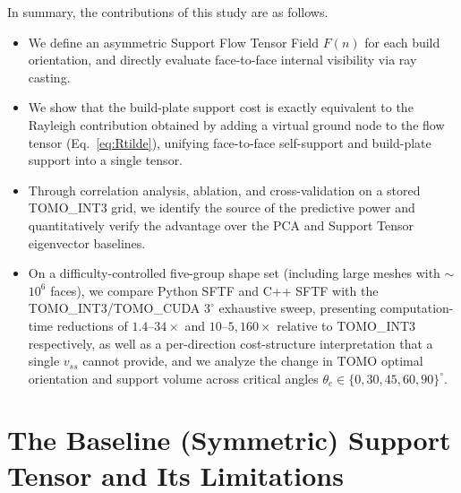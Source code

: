 \documentclass[11pt,a4paper]{article}
\begin{document}
In summary, the contributions of this study are as follows.
\begin{itemize}
\item We define an asymmetric Support Flow Tensor Field $F(n)$ for each build orientation, and directly evaluate face-to-face internal visibility via ray casting.
\item We show that the build-plate support cost is exactly equivalent to the Rayleigh contribution obtained by adding a virtual ground node to the flow tensor (Eq.~\eqref{eq:Rtilde}), unifying face-to-face self-support and build-plate support into a single tensor.
\item Through correlation analysis, ablation, and cross-validation on a stored TOMO\_INT3 grid, we identify the source of the predictive power and quantitatively verify the advantage over the PCA and Support Tensor eigenvector baselines.
\item On a difficulty-controlled five-group shape set (including large meshes with $\sim$$10^6$ faces), we compare Python SFTF and C++ SFTF with the TOMO\_INT3/TOMO\_CUDA $3^\circ$ exhaustive sweep, presenting computation-time reductions of $1.4$--$34\times$ and $10$--$5{,}160\times$ relative to TOMO\_INT3 respectively, as well as a per-direction cost-structure interpretation that a single $v_{ss}$ cannot provide, and we analyze the change in TOMO optimal orientation and support volume across critical angles $\theta_c\in\{0,30,45,60,90\}^\circ$.
\end{itemize}

\section{The Baseline (Symmetric) Support Tensor and Its Limitations}
\label{sec:support-tensor-limit}
\end{document}
